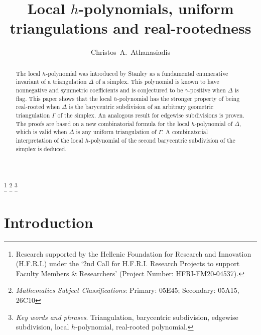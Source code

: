 \documentclass[11pt]{amsart}
\begin{document}
\title[Local $h$-polynomials and real-rootedness]
{Local $h$-polynomials, uniform triangulations
and real-rootedness}

\author{Christos~A.~Athanasiadis}

\address{Department of Mathematics\\
National and Kapodistrian University of Athens\\
Panepistimioupolis\\ 15784 Athens, Greece}

\thanks{Research supported by the Hellenic 
Foundation for Research and Innovation (H.F.R.I.) 
under the `2nd Call for H.F.R.I. Research Projects 
to support Faculty Members \& Researchers' 
(Project Number: HFRI-FM20-04537).}
\thanks{ \textit{Mathematics Subject 
Classifications}: Primary: 05E45; 
                  Secondary: 05A15, 26C10}
\thanks{\textit{Key words and phrases}. 
Triangulation, barycentric subdivision,  
edgewise subdivision, local $h$-polynomial, 
real-rooted polynomial.}

\begin{abstract}
The local $h$-polynomial was introduced by Stanley 
as a fundamental enumerative invariant of a 
triangulation $\Delta$ of a simplex. This 
polynomial is known to have nonnegative and 
symmetric coefficients and is conjectured to be 
$\gamma$-positive when $\Delta$ is flag. This 
paper shows that the local $h$-polynomial has the 
stronger property of being real-rooted when 
$\Delta$ is the barycentric subdivision of an 
arbitrary geometric triangulation $\Gamma$ of the 
simplex. An analogous result for edgewise 
subdivisions is proven. The proofs are based on a 
new combinatorial 
formula for the local $h$-polynomial of $\Delta$, 
which is valid when $\Delta$ is any uniform 
triangulation of $\Gamma$. A combinatorial 
interpretation of the local $h$-polynomial of the 
second barycentric subdivision of the simplex is
deduced.
\end{abstract}

\maketitle

\section{Introduction}
\label{sec:intro}
 
\end{document}
